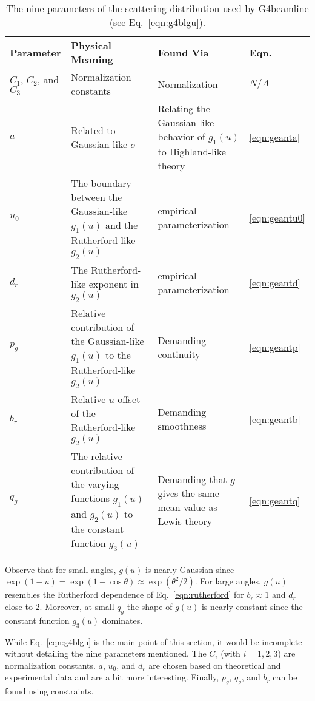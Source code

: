 \begin{table}
\caption[G4beamline scattering distribution parameters.]{The nine parameters of the scattering distribution used by G4beamline (see Eq.~\eqref{eqn:g4blgu}).}
\begin{tabularx}{\textwidth}{A B B C}
\hline \hline
	\textbf{Parameter} & \textbf{Physical Meaning} & \textbf{Found Via} & \textbf{Eqn.} \\
	$C_1$, $C_2$, and $C_3$ & Normalization constants & Normalization & $N/A$ \\
	$a$ & Related to Gaussian-like $\sigma$ & Relating the Gaussian-like behavior of $g_1(u)$ to Highland-like theory \cite{highland} & \ref{eqn:geanta} \\
	$u_0$ & The boundary between the Gaussian-like $g_1(u)$ and the Rutherford-like $g_2(u)$ & empirical parameterization & \ref{eqn:geantu0} \\
	$d_r$ & The Rutherford-like exponent in $g_2(u)$ & empirical parameterization & \ref{eqn:geantd} \\
	$p_g$ & Relative contribution of the Gaussian-like $g_1(u)$ to the Rutherford-like $g_2(u)$ & Demanding continuity & \ref{eqn:geantp} \\
	$b_r$ & Relative $u$ offset of the Rutherford-like $g_2(u)$ & Demanding smoothness & \ref{eqn:geantb} \\
	$q_g$ & The relative contribution of the varying functions $g_1(u)$ and $g_2(u)$ to the constant function $g_3(u)$ & Demanding that $g$ gives the same mean value as Lewis theory & \ref{eqn:geantq}\\
\hline
\end{tabularx}
\label{tbl:g4blgu_parameters}
\end{table}


Observe that for small angles, $g(u)$ is nearly Gaussian since $\exp{(1-u)}=\exp{(1-\cos\theta)}\approx\exp{(\theta^2/2)}$. For large angles, $g(u)$ resembles the Rutherford dependence of Eq.~\eqref{eqn:rutherford} for $b_r\approx 1$ and $d_r$ close to 2. Moreover, at small $q_g$ the shape of $g(u)$ is nearly constant since the constant function $g_3(u)$ dominates.

While Eq.~\eqref{eqn:g4blgu} is the main point of this section, it would be incomplete without detailing the nine parameters mentioned. The $C_i$ (with $i=1,2,3$) are normalization constants. $a$, $u_0$, and $d_r$ are chosen based on theoretical and experimental data and are a bit more interesting. Finally, $p_g$, $q_g$, and $b_r$ can be found using constraints. 


